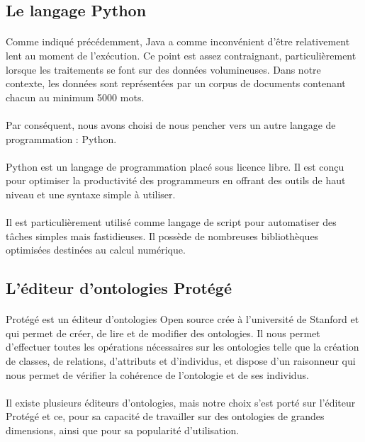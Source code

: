 \documentclass[12pt, a4paper, oneside]{book}
\begin{document}
\subsection{Le langage Python}
\paragraph{}
Comme indiqué précédemment, Java a comme inconvénient d'être relativement lent au moment de l'exécution.
Ce point est assez contraignant, particulièrement lorsque les traitements se font sur des données volumineuses.
Dans notre contexte, les données sont représentées par un corpus de documents contenant chacun au minimum 5000 mots.
\paragraph{}
Par conséquent, nous avons choisi de nous pencher vers un autre langage de programmation : Python.
\paragraph{}
Python est un langage de programmation placé sous licence libre. Il est conçu pour optimiser la productivité des programmeurs en offrant des outils de haut 
niveau et une syntaxe simple à utiliser.
\paragraph{}
Il est particulièrement utilisé comme langage de script pour automatiser des tâches simples mais fastidieuses. Il possède de nombreuses bibliothèques optimisées destinées au calcul numérique\citep{python}.

\subsection{L'éditeur d'ontologies Protégé}
\paragraph{}
Protégé est un éditeur d'ontologies Open source crée à l'université de Stanford et qui permet de créer, de lire et de modifier des ontologies. Il nous permet d'effectuer toutes les opérations nécessaires sur les ontologies telle que la création de classes, de relations, d'attributs et d'individus, et dispose d'un raisonneur qui nous permet de vérifier la cohérence de l'ontologie et de ses individus\citep{protege}. 
\paragraph{}
Il existe plusieurs éditeurs d'ontologies, mais notre choix s'est porté sur l'éditeur Protégé et ce,  pour sa capacité de travailler sur des ontologies de grandes dimensions, ainsi que pour sa popularité d'utilisation.
\end{document}
